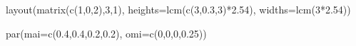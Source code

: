 \documentclass[11pt,]{article}
\newenvironment{Shaded}{}{}
\newcommand{\KeywordTok}[1]{\textcolor[rgb]{0.00,0.00,1.00}{#1}}
\newcommand{\DataTypeTok}[1]{#1}
\newcommand{\DecValTok}[1]{#1}
\newcommand{\FloatTok}[1]{#1}
\newcommand{\OperatorTok}[1]{#1}
\newcommand{\NormalTok}[1]{#1}
\begin{document}
\begin{Shaded}
\begin{Highlighting}[]
\KeywordTok{layout}\NormalTok{(}\KeywordTok{matrix}\NormalTok{(}\KeywordTok{c}\NormalTok{(}\DecValTok{1}\NormalTok{,}\DecValTok{0}\NormalTok{,}\DecValTok{2}\NormalTok{),}\DecValTok{3}\NormalTok{,}\DecValTok{1}\NormalTok{),}
       \DataTypeTok{heights=}\KeywordTok{lcm}\NormalTok{(}\KeywordTok{c}\NormalTok{(}\DecValTok{3}\NormalTok{,}\FloatTok{0.3}\NormalTok{,}\DecValTok{3}\NormalTok{)}\OperatorTok{*}\FloatTok{2.54}\NormalTok{),}
       \DataTypeTok{widths=}\KeywordTok{lcm}\NormalTok{(}\DecValTok{3}\OperatorTok{*}\FloatTok{2.54}\NormalTok{))}

\KeywordTok{par}\NormalTok{(}\DataTypeTok{mai=}\KeywordTok{c}\NormalTok{(}\FloatTok{0.4}\NormalTok{,}\FloatTok{0.4}\NormalTok{,}\FloatTok{0.2}\NormalTok{,}\FloatTok{0.2}\NormalTok{), }\DataTypeTok{omi=}\KeywordTok{c}\NormalTok{(}\DecValTok{0}\NormalTok{,}\DecValTok{0}\NormalTok{,}\DecValTok{0}\NormalTok{,}\FloatTok{0.25}\NormalTok{))}


\end{Highlighting}
\end{Shaded}
\end{document}
